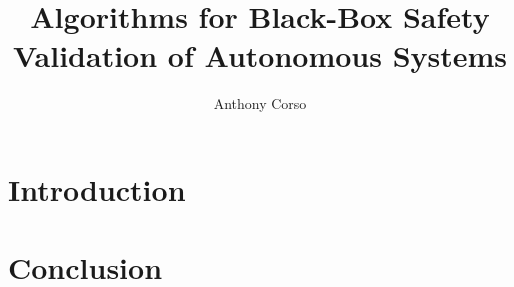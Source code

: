 \documentclass[12pt,letterpaper]{report}
\title{Algorithms for Black-Box Safety Validation of Autonomous Systems}
\author{Anthony Corso}
\begin{document}
\beforepreface





\afterpreface

\chapter{Introduction}


\chapter{Conclusion}


\printbibliography
\end{document}
